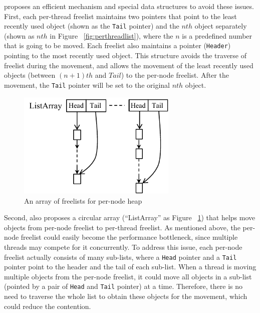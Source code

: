\NM{} proposes an efficient mechanism and special data structures to avoid these issues. First, each per-thread freelist maintains two pointers that point to the least recently used object (shown as the \texttt{Tail} pointer) and the $nth$ object separately (shown as $nth$ in Figure ~\ref{fig:perthreadlist}), where the $n$ is a predefined number that is going to be moved. Each freelist also maintains a pointer (\texttt{Header}) pointing to the most recently used object. This structure avoids the traverse of freelist during the movement, and allows the movement of the least recently used objects (between $(n+1)th$ and $Tail$) to the per-node freelist. After the movement, the \texttt{Tail} pointer will be set to the original $nth$ object. 


\begin{figure}[!ht]
\centering
\includegraphics[width=3in]{figure/listarray}
\caption{An array of freelists for per-node heap\label{fig:listarray}}
\end{figure}

Second, \NM{} also proposes a circular array (``ListArray'' as Figure ~\ref{fig:listarray}) that helps move objects from per-node freelist to per-thread freelist. As mentioned above, the per-node freelist could easily become the performance bottleneck, since multiple threads may compete for it concurrently. To address this issue, each per-node freelist actually consists of many sub-lists, where a \texttt{Head} pointer and a \texttt{Tail} pointer point to the header and the tail of each sub-list. When a thread is moving multiple objects from the per-node freelist, it could move all objects in a sub-list (pointed by a pair of \texttt{Head} and \texttt{Tail} pointer) at a time. Therefore, there is no need to traverse the whole list to obtain these objects for the movement, which could reduce the contention. 


